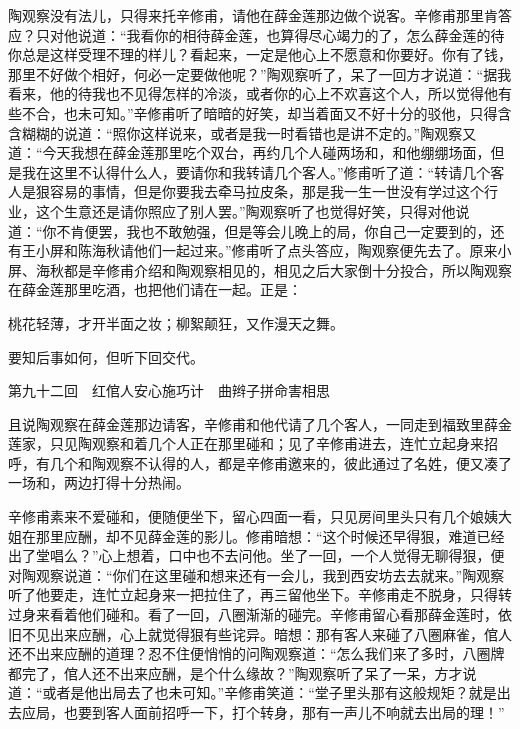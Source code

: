\documentclass[12pt,UTF8]{ctexbook}
\begin{document}
{{{陶观察没有法儿，只得来托辛修甫，请他在薛金莲那边做个说客。辛修甫那里肯答应？只对他说道：“我看你的相待薛金莲，也算得尽心竭力的了，怎么薛金莲的待你总是这样受理不理的样儿？看起来，一定是他心上不愿意和你要好。你有了钱，那里不好做个相好，何必一定要做他呢？”陶观察听了，呆了一回方才说道：“据我看来，他的待我也不见得怎样的冷淡，或者你的心上不欢喜这个人，所以觉得他有些不合，也未可知。”辛修甫听了暗暗的好笑，却当着面又不好十分的驳他，只得含含糊糊的说道：“照你这样说来，或者是我一时看错也是讲不定的。”陶观察又道：“今天我想在薛金莲那里吃个双台，再约几个人碰两场和，和他绷绷场面，但是我在这里不认得什么人，要请你和我转请几个客人。”修甫听了道：“转请几个客人是狠容易的事情，但是你要我去牵马拉皮条，那是我一生一世没有学过这个行业，这个生意还是请你照应了别人罢。”陶观察听了也觉得好笑，只得对他说道：“你不肯便罢，我也不敢勉强，但是等会儿晚上的局，你自己一定要到的，还有王小屏和陈海秋请他们一起过来。”修甫听了点头答应，陶观察便先去了。原来小屏、海秋都是辛修甫介绍和陶观察相见的，相见之后大家倒十分投合，所以陶观察在薛金莲那里吃酒，也把他们请在一起。正是：

桃花轻薄，才开半面之妆；柳絮颠狂，又作漫天之舞。

要知后事如何，但听下回交代。





第九十二回　红倌人安心施巧计　曲辫子拼命害相思





且说陶观察在薛金莲那边请客，辛修甫和他代请了几个客人，一同走到福致里薛金莲家，只见陶观察和着几个人正在那里碰和；见了辛修甫进去，连忙立起身来招呼，有几个和陶观察不认得的人，都是辛修甫邀来的，彼此通过了名姓，便又凑了一场和，两边打得十分热闹。

辛修甫素来不爱碰和，便随便坐下，留心四面一看，只见房间里头只有几个娘姨大姐在那里应酬，却不见薛金莲的影儿。修甫暗想：“这个时候还早得狠，难道已经出了堂唱么？”心上想着，口中也不去问他。坐了一回，一个人觉得无聊得狠，便对陶观察说道：“你们在这里碰和想来还有一会儿，我到西安坊去去就来。”陶观察听了他要走，连忙立起身来一把拉住了，再三留他坐下。辛修甫走不脱身，只得转过身来看着他们碰和。看了一回，八圈渐渐的碰完。辛修甫留心看那薛金莲时，依旧不见出来应酬，心上就觉得狠有些诧异。暗想：那有客人来碰了八圈麻雀，倌人还不出来应酬的道理？忍不住便悄悄的问陶观察道：“怎么我们来了多时，八圈牌都完了，倌人还不出来应酬，是个什么缘故？”陶观察听了呆了一呆，方才说道：“或者是他出局去了也未可知。”辛修甫笑道：“堂子里头那有这般规矩？就是出去应局，也要到客人面前招呼一下，打个转身，那有一声儿不响就去出局的理！”

}}}
\end{document}
